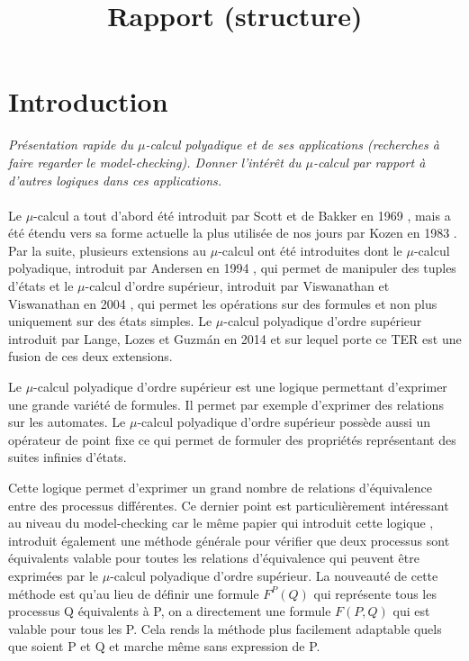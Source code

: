 \documentclass[11pt,a4paper]{article}
\title{Rapport (structure)}
\date{}
\begin{document}
\maketitle

\section*{Introduction}

\textit{Présentation rapide du $\mu$-calcul polyadique et de ses applications (recherches à faire regarder le model-checking). Donner l'intérêt du $\mu$-calcul par rapport à d'autres logiques dans ces applications.}
\\\\

Le $\mu$-calcul a tout d'abord été introduit par Scott et de Bakker en 1969 \cite{scott1969theory}, mais a été étendu vers sa forme actuelle la plus utilisée de nos jours par Kozen en 1983 \cite{kozen1983results}. Par la suite, plusieurs extensions au 
$\mu$-calcul ont été introduites dont le $\mu$-calcul polyadique, introduit par Andersen en 1994 \cite{andersen1994polyadic}, qui permet de manipuler des tuples d'états et le $\mu$-calcul d'ordre supérieur, introduit par Viswanathan et Viswanathan en 2004 \cite{viswanathan2004higher}, qui permet les opérations sur des formules et non plus uniquement sur des états simples. Le $\mu$-calcul polyadique d'ordre supérieur introduit par Lange, Lozes et Guzm{\'a}n en 2014 \cite{lange2014model} et sur lequel porte ce TER est une fusion de ces deux extensions.

\color{red}
Le $\mu$-calcul polyadique d'ordre supérieur est une logique permettant d'exprimer une grande variété de formules. Il permet par exemple d'exprimer des relations sur les automates. Le $\mu$-calcul polyadique d'ordre supérieur possède aussi un opérateur de point fixe ce qui permet de formuler des propriétés représentant des suites infinies d'états. 

Cette logique permet d'exprimer un grand nombre de relations d'équivalence entre des processus différentes. Ce dernier point est particulièrement intéressant au niveau du model-checking car le même papier qui introduit cette logique \cite{lange2014model}, introduit également une méthode générale pour vérifier que deux processus sont équivalents valable pour toutes les relations d'équivalence qui peuvent être exprimées par le $\mu$-calcul polyadique d'ordre supérieur. La nouveauté de cette méthode est qu'au lieu de définir une formule $F^P(Q)$ qui représente tous les processus Q équivalents à P, on a directement une formule $F(P, Q)$ qui est valable pour tous les P. Cela rends la méthode plus facilement adaptable quels que soient P et Q et marche même sans expression de P. 
\end{document}
